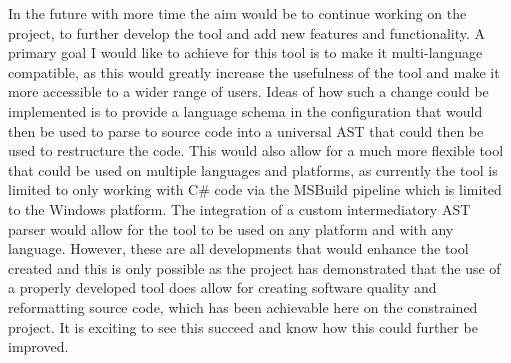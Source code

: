 In the future with more time the aim would be to continue working on the project, to further develop the tool and add new features and functionality. A primary goal I would like to achieve for this tool is to make it multi-language compatible, as this would greatly increase the usefulness of the tool and make it more accessible to a wider range of users. Ideas of how such a change could be implemented is to provide a language schema in the configuration that would then be used to parse to source code into a universal AST that could then be used to restructure the code. This would also allow for a much more flexible tool that could be used on multiple languages and platforms, as currently the tool is limited to only working with C\# code via the MSBuild pipeline which is limited to the Windows platform. The integration of a custom intermediatory AST parser would allow for the tool to be used on any platform and with any language. However, these are all developments that would enhance the tool created and this is only possible as the project has demonstrated that the use of a properly developed tool does allow for creating software quality and reformatting source code, which has been achievable here on the constrained project. It is exciting to see this succeed and know how this could further be improved.
